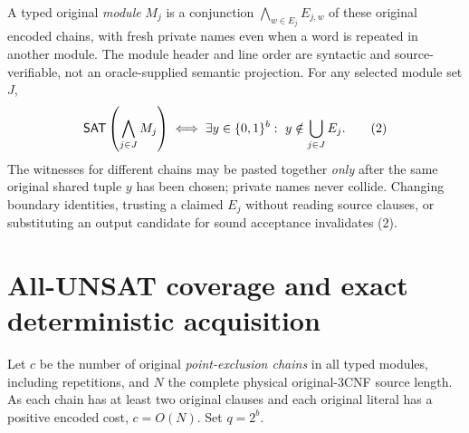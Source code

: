 A typed original \emph{module} $M_j$ is a conjunction $\bigwedge_{w\in E_j}E_{j,w}$ of these original encoded chains, with fresh private names even when a word is repeated in another module. The module header and line order are syntactic and source-verifiable, not an oracle-supplied semantic projection. For any selected module set $J$,
\begin{equation}
\mathsf{SAT}\left(\bigwedge_{j\in J}M_j\right)
\iff\exists y\in\{0,1\}^b:\ y\notin\bigcup_{j\in J}E_j.\tag{2}
\end{equation}
The witnesses for different chains may be pasted together \emph{only} after the same original shared tuple $y$ has been chosen; private names never collide. Changing boundary identities, trusting a claimed $E_j$ without reading source clauses, or substituting an output candidate for sound acceptance invalidates (2).

\section{All-UNSAT coverage and exact deterministic acquisition}
Let $c$ be the number of original \emph{point-exclusion chains} in all typed modules, including repetitions, and $N$ the complete physical original-3CNF source length. As each chain has at least two original clauses and each original literal has a positive encoded cost, $c=O(N)$. Set $q=2^b$.

